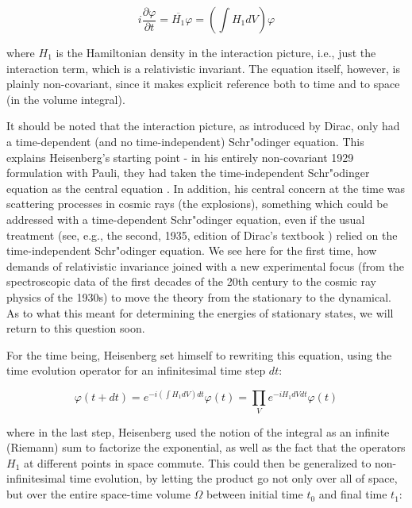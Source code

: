 \documentclass[12pt,a4paper]{article}
\begin{document}
\begin{equation}
i \frac{\partial \varphi}{\partial t} = \overline{H_1} \varphi = \left( \int H_1 dV \right) \varphi
\end{equation}

where $H_1$ is the Hamiltonian density in the interaction picture, i.e., just the interaction term, which is a relativistic invariant. The equation itself, however, is plainly non-covariant, since it makes explicit reference both to time and to space (in the volume integral).

It should be noted that the interaction picture, as introduced by Dirac, only had a time-dependent (and no time-independent) Schr"odinger equation. This explains Heisenberg's starting point - in his entirely non-covariant 1929 formulation with Pauli, they had taken the time-independent Schr"odinger equation as the central equation \citep{heisenberg_1929_zur-quantendynamik}. In addition, his central concern at the time was scattering processes in cosmic rays (the explosions), something which could be addressed with a time-dependent Schr"odinger equation, even if the usual treatment (see, e.g., the second, 1935, edition of Dirac's textbook \citep{dirac_1935_the-principles}) relied on the time-independent Schr"odinger equation. We see here for the first time, how demands of relativistic invariance joined with a new experimental focus (from the spectroscopic data of the first decades of the 20th century to the cosmic ray physics of the 1930s) to move the theory from the stationary to the dynamical. As to what this meant for determining the energies of stationary states, we will return to this question soon.

For the time being, Heisenberg set himself to rewriting this equation, using the time evolution operator for an infinitesimal time step $dt$:

\begin{equation}
\varphi (t + dt) = e^{-i \left( \int H_1 dV \right) dt} \varphi(t) = \prod_V e^{-i H_1 dV dt} \varphi(t)
\end{equation}

where in the last step, Heisenberg used the notion of the integral as an infinite (Riemann) sum to factorize the exponential, as well as the fact that the operators $H_1$ at different points in space commute. This could then be generalized to non-infinitesimal time evolution, by letting the product go not only over all of space, but over the entire space-time volume $\Omega$ between initial time $t_0$ and final time $t_1$:
\end{document}
